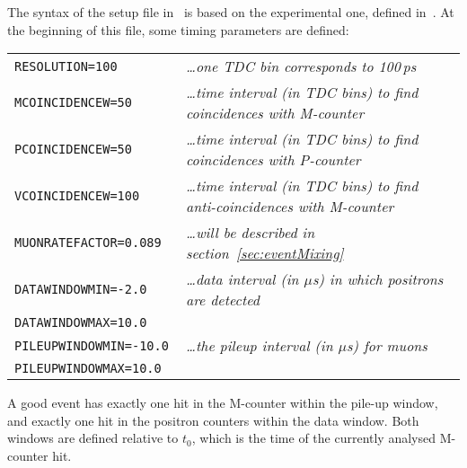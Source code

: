 \documentclass[twoside]{dis04}
\begin{document}
The syntax of the setup file in \musrSimAna\ is based on the experimental one, 
defined in~\cite{TDCsetup}.
At the beginning of this file, some timing parameters are defined:\\[1em]
\begin{tabular}{ll}
{\tt RESOLUTION=100 } & \emph{\ldots one TDC bin corresponds to 100\,ps} \\[0.7em]
{\tt MCOINCIDENCEW=50 } & \emph{\ldots time interval (in TDC bins) to find coincidences with M-counter} \\
{\tt PCOINCIDENCEW=50 } & \emph{\ldots time interval (in TDC bins) to find coincidences with P-counter} \\
{\tt VCOINCIDENCEW=100 } & \emph{\ldots time interval (in TDC bins) to find anti-coincidences with M-counter} \\[0.7em]
{\tt MUONRATEFACTOR=0.089 } & \emph{\ldots will be described in section~\ref{sec:eventMixing}} \\[0.7em]
{\tt DATAWINDOWMIN=-2.0 } & \emph{\ldots data interval (in $\mu$s) in which positrons are detected} \\
{\tt DATAWINDOWMAX=10.0 } &  \\[0.7em]
{\tt PILEUPWINDOWMIN=-10.0 } & \emph{\ldots the pileup interval (in $\mu$s)  for muons} \\
{\tt PILEUPWINDOWMAX=10.0 } & \\[1em]
\end{tabular}
%
A good event has exactly one hit in the M-counter within the pile-up window, and exactly
one hit in the positron counters within the data window.  Both windows are defined relative to $t_0$,
which is the time of the currently analysed M-counter hit.
\end{document}
